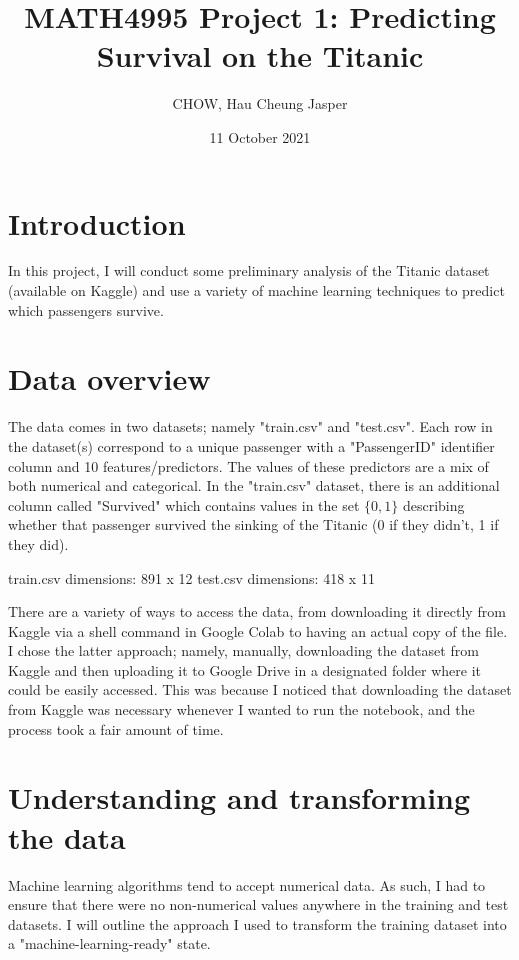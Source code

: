 \documentclass[12pt]{article}
\title{MATH4995 Project 1: Predicting Survival on the Titanic}
\author{CHOW, Hau Cheung Jasper}
\date{11 October 2021}
\begin{document}
\maketitle

\section{Introduction}
In this project, I will conduct some preliminary analysis of the Titanic dataset (available on Kaggle) and use a variety of machine learning techniques to predict which passengers survive.

\section{Data overview}
The data comes in two datasets; namely "train.csv" and "test.csv". Each row in the dataset(s) correspond to a unique passenger with a "PassengerID" identifier column and 10 features/predictors. The values of these predictors are a mix of both numerical and categorical. In the "train.csv" dataset, there is an additional column called "Survived" which contains values in the set $\{0,1\}$ describing whether that passenger survived the sinking of the Titanic (0 if they didn't, 1 if they did).\newline

\noindent train.csv dimensions: 891 x 12\newline
test.csv dimensions: 418 x 11\newline

There are a variety of ways to access the data, from downloading it directly from Kaggle via a shell command in Google Colab to having an actual copy of the file. I chose the latter approach; namely, manually, downloading the dataset from Kaggle and then uploading it to Google Drive in a designated folder where it could be easily accessed. This was because I noticed that downloading the dataset from Kaggle was necessary whenever I wanted to run the notebook, and the process took a fair amount of time.

\section{Understanding and transforming the data}
Machine learning algorithms tend to accept numerical data. As such, I had to ensure that there were no non-numerical values anywhere in the training and test datasets. I will outline the approach I used to transform the training dataset into a "machine-learning-ready" state.
\end{document}
